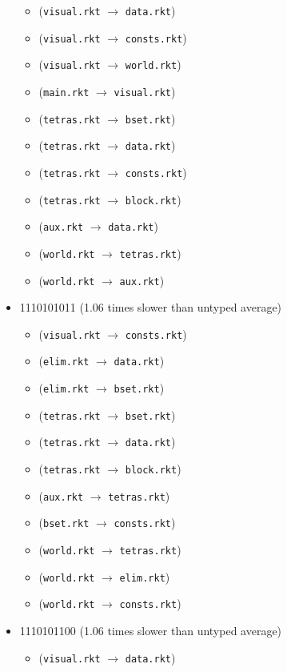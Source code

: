 \documentclass{article}
\newcommand{\mono}[1]{\texttt{#1}}
\begin{document}
\begin{itemize}
\begin{itemize}
  \item (\mono{visual.rkt} $\rightarrow$ \mono{data.rkt})
  \item (\mono{visual.rkt} $\rightarrow$ \mono{consts.rkt})
  \item (\mono{visual.rkt} $\rightarrow$ \mono{world.rkt})
  \item (\mono{main.rkt} $\rightarrow$ \mono{visual.rkt})
  \item (\mono{tetras.rkt} $\rightarrow$ \mono{bset.rkt})
  \item (\mono{tetras.rkt} $\rightarrow$ \mono{data.rkt})
  \item (\mono{tetras.rkt} $\rightarrow$ \mono{consts.rkt})
  \item (\mono{tetras.rkt} $\rightarrow$ \mono{block.rkt})
  \item (\mono{aux.rkt} $\rightarrow$ \mono{data.rkt})
  \item (\mono{world.rkt} $\rightarrow$ \mono{tetras.rkt})
  \item (\mono{world.rkt} $\rightarrow$ \mono{aux.rkt})
  \end{itemize}
\item 1110101011 (1.06 times slower than untyped average)
  \begin{itemize}
  \item (\mono{visual.rkt} $\rightarrow$ \mono{consts.rkt})
  \item (\mono{elim.rkt} $\rightarrow$ \mono{data.rkt})
  \item (\mono{elim.rkt} $\rightarrow$ \mono{bset.rkt})
  \item (\mono{tetras.rkt} $\rightarrow$ \mono{bset.rkt})
  \item (\mono{tetras.rkt} $\rightarrow$ \mono{data.rkt})
  \item (\mono{tetras.rkt} $\rightarrow$ \mono{block.rkt})
  \item (\mono{aux.rkt} $\rightarrow$ \mono{tetras.rkt})
  \item (\mono{bset.rkt} $\rightarrow$ \mono{consts.rkt})
  \item (\mono{world.rkt} $\rightarrow$ \mono{tetras.rkt})
  \item (\mono{world.rkt} $\rightarrow$ \mono{elim.rkt})
  \item (\mono{world.rkt} $\rightarrow$ \mono{consts.rkt})
  \end{itemize}
\item 1110101100 (1.06 times slower than untyped average)
  \begin{itemize}
  \item (\mono{visual.rkt} $\rightarrow$ \mono{data.rkt})

\end{itemize}
\end{itemize}
\end{document}
